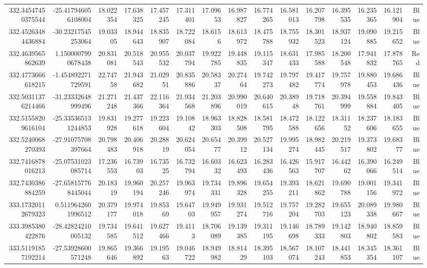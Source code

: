 \begin{center}
\begin{longtable}{rrrrrrrrrrrrrrr}
332.34547450375544 & -25.417946056108004 & 18.022354 & 17.638325 & 17.457245 & 17.311401 & 17.09653 & 16.987827 & 16.774265 & 16.581013 & 16.207798 & 16.395535 & 16.235365 & 16.121904 & Blue \\
332.45263484436884 & -30.23217545253064 & 19.03305 & 18.944643 & 18.835907 & 18.722084 & 18.6156 & 18.613972 & 18.475788 & 18.755932 & 18.301523 & 18.937124 & 19.090885 & 19.215652 & Blue \\
332.4639565862639 & 1.1500007990678438 & 20.831081 & 20.518543 & 20.955532 & 20.037794 & 19.922785 & 19.448835 & 19.115347 & 18.631433 & 17.985588 & 18.200548 & 17.941832 & 17.878765 & Red \\
332.4773666618215 & -1.454892271729591 & 22.74758 & 21.943682 & 21.02951 & 20.835886 & 20.58337 & 20.27464 & 19.742273 & 19.797482 & 19.417774 & 19.757978 & 19.880453 & 19.686436 & Blue \\
332.50311376214466 & -31.23332648999496 & 21.271248 & 21.437366 & 22.116364 & 21.934568 & 21.203896 & 20.990019 & 20.640615 & 20.38948 & 19.718761 & 20.394999 & 19.558884 & 19.843405 & Blue \\
332.51558209616104 & -25.335365131244853 & 19.831928 & 19.277618 & 19.223604 & 19.10842 & 18.963303 & 18.828508 & 18.581795 & 18.472588 & 18.122656 & 18.31152 & 18.237606 & 18.183655 & Blue \\
332.5240068270393 & -27.91075708397664 & 20.798483 & 20.406918 & 20.28819 & 20.624054 & 20.65477 & 20.39912 & 20.527134 & 19.995274 & 18.982445 & 20.219517 & 19.373802 & 19.68377 & Blue \\
332.7416878016213 & -25.07531023085714 & 17.236553 & 16.73903 & 16.73525 & 16.732794 & 16.60332 & 16.623493 & 16.283436 & 16.426563 & 15.917707 & 16.44262 & 16.390066 & 16.249514 & Blue \\
332.7430386884259 & -27.658157768445044 & 20.18319 & 19.960194 & 20.257246 & 19.963974 & 19.734331 & 19.896328 & 19.654255 & 19.393211 & 18.621862 & 19.690788 & 19.001156 & 19.341972 & Blue \\
333.17320112679323 & 0.5119642601996512 & 20.379177 & 19.974018 & 19.85369 & 19.64703 & 19.949957 & 19.931274 & 19.512716 & 19.757204 & 19.282703 & 19.655123 & 20.089338 & 19.980667 & Blue \\
333.3985380422876 & -28.42824210005132 & 19.734585 & 19.641512 & 19.627466 & 19.4113 & 18.706089 & 19.139385 & 19.311195 & 19.146698 & 18.789333 & 19.142803 & 18.940802 & 18.859583 & Blue \\
333.51191857192214 & -27.53928600571248 & 19.865646 & 19.366892 & 19.19563 & 19.046722 & 18.949982 & 18.81429 & 18.395103 & 18.567074 & 18.107243 & 18.441853 & 18.345354 & 18.361107 & Blue \\

\end{longtable}
\end{center}
